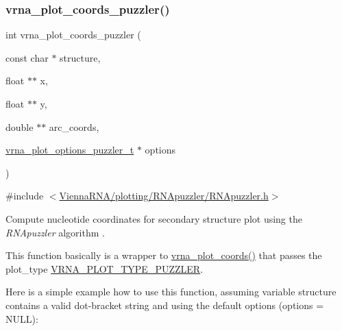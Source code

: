 \subsubsection{\texorpdfstring{vrna\_plot\_coords\_puzzler()}{vrna\_plot\_coords\_puzzler()}}
{\footnotesize\ttfamily int vrna\+\_\+plot\+\_\+coords\+\_\+puzzler (\begin{DoxyParamCaption}\item[{const char $\ast$}]{structure,  }\item[{float $\ast$$\ast$}]{x,  }\item[{float $\ast$$\ast$}]{y,  }\item[{double $\ast$$\ast$}]{arc\+\_\+coords,  }\item[{\mbox{\hyperlink{group__plot__layout__utils_structvrna__plot__options__puzzler__t}{vrna\+\_\+plot\+\_\+options\+\_\+puzzler\+\_\+t}} $\ast$}]{options }\end{DoxyParamCaption})}



{\ttfamily \#include $<$\mbox{\hyperlink{RNApuzzler_8h}{Vienna\+R\+N\+A/plotting/\+R\+N\+Apuzzler/\+R\+N\+Apuzzler.\+h}}$>$}



Compute nucleotide coordinates for secondary structure plot using the {\itshape R\+N\+Apuzzler} algorithm \cite{wiegreffe:2018}. 

This function basically is a wrapper to \mbox{\hyperlink{group__plot__layout__utils_ga2e2adbef0283a8ff2dfe5284eb1f4a6a}{vrna\+\_\+plot\+\_\+coords()}} that passes the {\ttfamily plot\+\_\+type} \mbox{\hyperlink{group__plot__layout__utils_ga64ec68055e241d11f659edb50f27ecae}{V\+R\+N\+A\+\_\+\+P\+L\+O\+T\+\_\+\+T\+Y\+P\+E\+\_\+\+P\+U\+Z\+Z\+L\+ER}}.

Here is a simple example how to use this function, assuming variable {\ttfamily structure} contains a valid dot-\/bracket string and using the default options ({\ttfamily options} = N\+U\+LL)\+: 
\begin{DoxyCode}{0}
\DoxyCodeLine{}
\DoxyCodeLine{\} \textcolor{keywordflow}{else} \{}
\DoxyCodeLine{\}}
\DoxyCodeLine{}
\end{DoxyCode}


